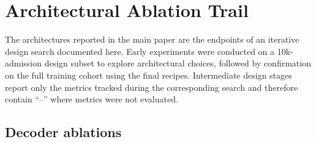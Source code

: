 \section{Architectural Ablation Trail}
\label{app:ablation-trail}

The architectures reported in the main paper are the endpoints of an iterative design search documented here. Early experiments were conducted on a 10k-admission design subset to explore architectural choices, followed by confirmation on the full training cohort using the final recipes. Intermediate design stages report only the metrics tracked during the corresponding search and therefore contain ``--'' where metrics were not evaluated.

\subsection{Decoder ablations}

